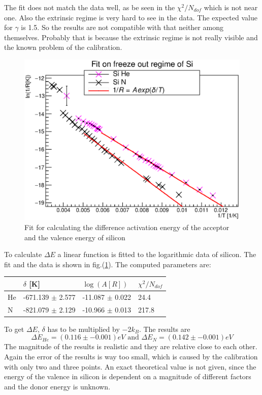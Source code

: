 \documentclass{article}
\begin{document}
The fit does not match the data well, as be seen in the $\chi^2/N_{dof}$ which is not near one. Also the extrinsic regime is very hard to see in the data. 
The expected value for $\gamma$ is 1.5. So the results are not compatible with that neither among themselves. Probably that is because the extrinsic regime is not really visible and the known problem of the calibration.
\begin{figure}[H]
    \centering
    \includegraphics[width=\textwidth]{Graphen/Si_Tinv.eps}
    \caption{Fit for calculating the difference  activation energy of the acceptor and the valence energy of silicon}
    \label{Si}
\end{figure}
To calculate $\Delta E$ a linear function is fitted to the logarithmic data of silicon. The fit and the data is shown in fig.(\ref{Si}). The computed parameters are:
\begin{table}[H]
    \centering
        \begin{tabular}{l|l|l|l}
         & $\delta$ [K] & $\log(A[R])$ & $\chi^2/N_{dof}$\\\hline
        He & -671.139 $\pm$ 2.577  & -11.087 $\pm$ 0.022 & 24.4 \\
        N & -821.079 $\pm$ 2.129  & -10.966 $\pm$  0.013 & 217.8 \\
        \end{tabular}
\end{table}
To get $\Delta E$, $\delta$ has to be multiplied by $-2 k_B$. The results are
\begin{equation*}
    \Delta E_{He} = (0.116 \pm -0.001)eV \mbox{ and } \Delta E_{N} = (0.142 \pm -0.001)eV
\end{equation*}
The magnitude of the results is realistic and they are relative close to each other. Again the error of the results is way too small, which is caused by the calibration with only two and three points. An exact theoretical value is not given, since the energy of the valence in silicon is dependent on a magnitude of different factors and the donor energy is unknown.
\end{document}
